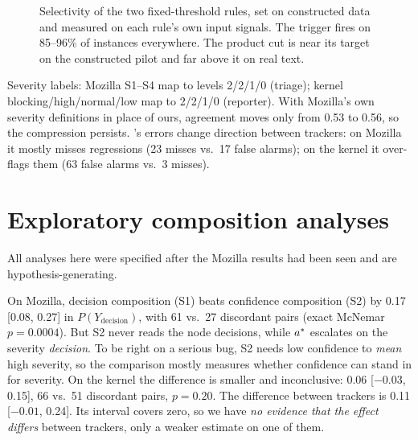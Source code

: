 \begin{figure}[t]
\centering
{}
\caption{Selectivity of the two fixed-threshold rules, set on constructed
data and measured on each rule's own input signals. The trigger fires on
85--96\% of instances everywhere. The product cut is near its target on
the constructed pilot and far above it on real text.}
\label{fig:transfer}
\end{figure}



Severity labels: Mozilla S1--S4 map to levels 2/2/1/0 (triage); kernel
blocking/high/normal/low map to 2/2/1/0 (reporter). With Mozilla's own
severity definitions in place of ours, agreement moves only from 0.53 to
0.56, so the compression persists. \noul{}'s errors change direction
between trackers: on Mozilla it mostly misses regressions (23 misses
vs.\ 17 false alarms); on the kernel it over-flags them (63 false alarms
vs.\ 3 misses).

\section{Exploratory composition analyses}
\label{app:exploratory}
All analyses here were specified after the Mozilla results had been seen
and are hypothesis-generating.

 On Mozilla, decision
composition (S1) beats confidence composition (S2) by 0.17 [0.08, 0.27]
in $P(Y_{\text{decision}})$, with 61 vs.\ 27 discordant pairs (exact
McNemar $p = 0.0004$). But S2 never reads the node decisions, while
$a^{*}$ escalates on the severity \emph{decision}. To be right on a
serious bug, S2 needs low confidence to \emph{mean} high severity, so the
comparison mostly measures whether confidence can stand in for severity.
On the kernel the difference is smaller and inconclusive: 0.06
[$-0.03$, 0.15], 66 vs.\ 51 discordant pairs, $p = 0.20$. The difference
between trackers is 0.11 [$-0.01$, 0.24]. Its interval covers zero, so we
have \emph{no evidence that the effect differs} between trackers, only a
weaker estimate on one of them.


